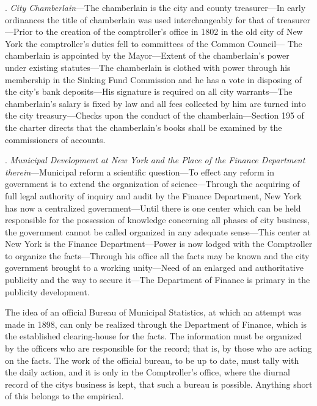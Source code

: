 \documentclass[openany,nobib]{tufte-book}
\begin{document}
\vspace{.15in}

.\emph{ City Chamberlain}---The chamberlain is the city and county
treasurer---In early ordinances the title of chamberlain was used
interchangeably for that of treasurer---Prior to the creation of the
comptroller's office in 1802 in the old city of New York the
comptroller's duties fell to committees of the Common Council--- The
chamberlain is appointed by the Mayor---Extent of the chamberlain's
power under existing statutes---The chamberlain is clothed with power
through his membership in the Sinking Fund Commission and he has a vote
in disposing of the city's bank deposits---His signature is required on
all city warrants---The chamberlain's salary is fixed by law and all
fees collected by him are turned into the city treasury---Checks upon
the conduct of the chamberlain---Section 195 of the charter directs that
the chamberlain's books shall be examined by the commissioners of
accounts.~

\vspace{.15in}

. \emph{Municipal Development at New York and the Place of the Finance
Department therein}---Municipal reform a scientific question---To effect
any reform in government is to extend the organization of
science---Through the acquiring of full legal authority of inquiry and
audit by the Finance Department, New York has now a centralized
government---Until there is one center which can be held responsible for
the possession of knowledge concerning all phases of city business, the
government cannot be called organized in any adequate sense---This
center at New York is the Finance Department---Power is now lodged with
the Comptroller to organize the facts---Through his office all the facts
may be known and the city government brought to a working unity---Need
of an enlarged and authoritative publicity and the way to secure
it---The Department of Finance is primary in the publicity development.~

The idea of an official Bureau of Municipal Statistics, at which an
attempt was made in 1898, can only be realized through the Department of
Finance, which is the established clearing-house for the facts. The
information must be organized by the officers who are responsible for
the record; that is, by those who are acting on the facts. The work of
the official bureau, to be up to date, must tally with the daily action,
and it is only in the Comptroller's office, where the diurnal record of
the city\textquotesingle s business is kept, that such a bureau is
possible. Anything short of this belongs to the empirical.~
\end{document}
